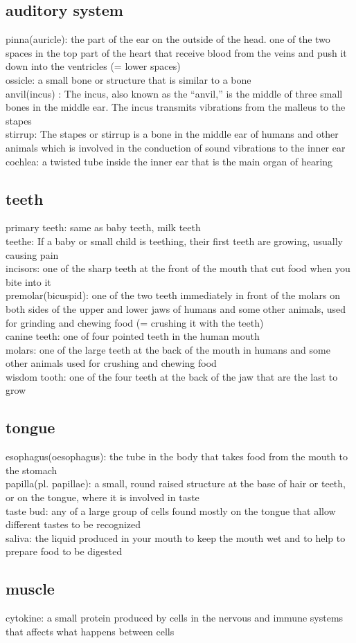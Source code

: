 \documentclass{article}
\begin{document}
\subsection{auditory system}
pinna(auricle): the part of the ear on the outside of the head. one of the two spaces in the top part of the heart that receive blood from the veins and push it down into the ventricles (= lower spaces) \\
ossicle: a small bone or structure that is similar to a bone \\
anvil(incus) : The incus, also known as the “anvil,” is the middle of three small bones in the middle ear. The incus transmits vibrations from the malleus to the stapes \\
stirrup: The stapes or stirrup is a bone in the middle ear of humans and other animals which is involved in the conduction of sound vibrations to the inner ear \\
cochlea: a twisted tube inside the inner ear that is the main organ of hearing\\

\subsection{teeth}
primary teeth: same as baby teeth, milk teeth\\
teethe: If a baby or small child is teething, their first teeth are growing, usually causing pain \\
incisors: one of the sharp teeth at the front of the mouth that cut food when you bite into it \\
premolar(bicuspid): one of the two teeth immediately in front of the molars on both sides of the upper and lower jaws of humans and some other animals, used for grinding and chewing food (= crushing it with the teeth) \\
canine teeth: one of four pointed teeth in the human mouth\\
molars: one of the large teeth at the back of the mouth in humans and some other animals used for crushing and chewing food \\
wisdom tooth: one of the four teeth at the back of the jaw that are the last to grow\\

\subsection{tongue}
esophagus(oesophagus): the tube in the body that takes food from the mouth to the stomach\\
papilla(pl. papillae): a small, round raised structure at the base of hair or teeth, or on the tongue, where it is involved in taste \\
taste bud: any of a large group of cells found mostly on the tongue that allow different tastes to be recognized \\
saliva: the liquid produced in your mouth to keep the mouth wet and to help to prepare food to be digested \\

\subsection{muscle}
cytokine: a small protein produced by cells in the nervous and immune systems that affects what happens between cells \\
\end{document}
